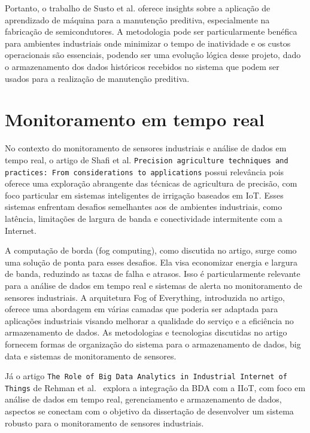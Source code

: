 Portanto, o trabalho de Susto et al. oferece insights sobre a aplicação de aprendizado de máquina para a manutenção preditiva, especialmente na fabricação de semicondutores. A metodologia pode ser particularmente benéfica para ambientes industriais onde minimizar o tempo de inatividade e os custos operacionais são essenciais, podendo ser uma evolução lógica desse projeto, dado o armazenamento dos dados históricos recebidos no sistema que podem ser usados para a realização de manutenção preditiva.


\section{Monitoramento em tempo real}

No contexto do monitoramento de sensores industriais e análise de dados em tempo real, o artigo de Shafi et al. \cite{shafi2019precision} \texttt{Precision agriculture techniques and practices: From considerations to applications} possui relevância pois oferece uma exploração abrangente das técnicas de agricultura de precisão, com foco particular em sistemas inteligentes de irrigação baseados em IoT. Esses sistemas enfrentam desafios semelhantes aos de ambientes industriais, como latência, limitações de largura de banda e conectividade intermitente com a Internet.
 
A computação de borda (fog computing), como discutida no artigo, surge como uma solução de ponta para esses desafios. Ela visa economizar energia e largura de banda, reduzindo as taxas de falha e atrasos. Isso é particularmente relevante para a análise de dados em tempo real e sistemas de alerta no monitoramento de sensores industriais. A arquitetura Fog of Everything, introduzida no artigo, oferece uma abordagem em várias camadas que poderia ser adaptada para aplicações industriais visando melhorar a qualidade do serviço e a eficiência no armazenamento de dados. As metodologias e tecnologias discutidas no artigo fornecem formas de organização do sistema para o armazenamento de dados, big data e sistemas de monitoramento de sensores.

Já o artigo \texttt{The Role of Big Data Analytics in Industrial Internet of Things} de Rehman et al.~\cite{REHMAN} explora a integração da \gls{BDA} com a \gls{IIoT}, com foco em análise de dados em tempo real, gerenciamento e armazenamento de dados, aspectos se conectam com o objetivo da dissertação de desenvolver um sistema robusto para o monitoramento de sensores industriais.

